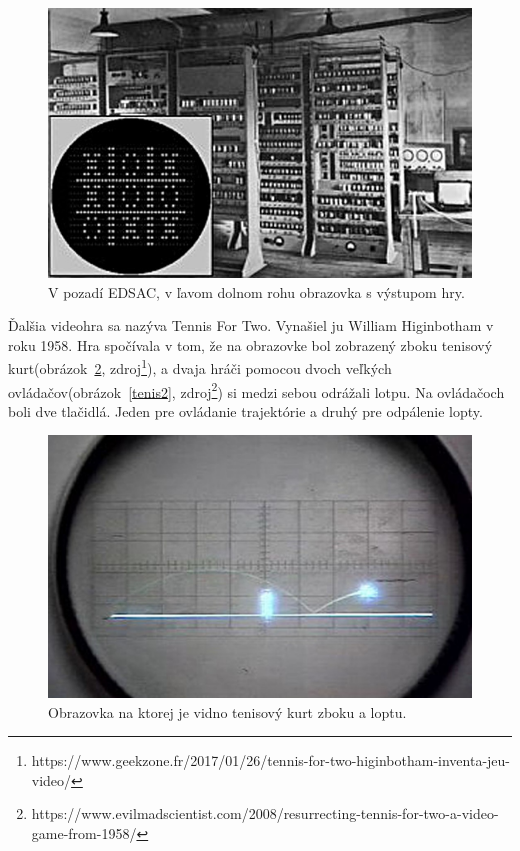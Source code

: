 \documentclass[10pt,oneside,slovak,a4paper]{article}
\begin{document}
\begin{figure}[tbh]
\centering
\includegraphics[scale=0.3]{oxo.jpg}
\caption{V pozadí EDSAC, v ľavom dolnom rohu obrazovka s výstupom hry.}
\label{oxo}
\end{figure}

Ďalšia videohra sa nazýva Tennis For Two. Vynašiel ju William Higinbotham v roku 1958. Hra spočívala v tom, že na obrazovke bol zobrazený zboku tenisový kurt(obrázok~\ref{tenis}, zdroj\footnote{https://www.geekzone.fr/2017/01/26/tennis-for-two-higinbotham-inventa-jeu-video/}), a dvaja hráči pomocou dvoch veľkých ovládačov(obrázok~\ref{tenis2}, zdroj\footnote{https://www.evilmadscientist.com/2008/resurrecting-tennis-for-two-a-video-game-from-1958/}) si medzi sebou odrážali lotpu. Na ovládačoch boli dve tlačidlá. Jeden pre ovládanie trajektórie a druhý pre odpálenie lopty.

\begin{figure}[tbh]
\centering
\includegraphics[scale=0.25]{tenis.jpg}
\caption{Obrazovka na ktorej je vidno tenisový kurt zboku a loptu.}
\label{tenis}
\end{figure}
\end{document}
